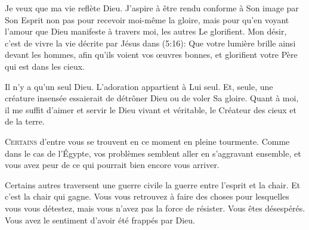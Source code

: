 
Je veux que ma vie reflète Dieu. J'aspire à être rendu conforme
 à Son image par Son Esprit \ocadr non pas pour recevoir moi-même la gloire,
 mais pour qu'en voyant l'amour que Dieu manifeste à travers moi,
 les autres Le glorifient.
 Mon désir, c'est de vivre la vie décrite par Jésus
 dans (5:16):
 \Og Que votre lumière brille ainsi devant les hommes,
 afin qu'ils voient vos \oe{}uvres bonnes,
 et glorifient votre Père qui est dans les cieux. \Fg{}

Il n'y a qu'un seul Dieu. L'adoration appartient à Lui seul.
 Et, seule, 
 une créature insensée essaierait de détrôner Dieu ou de voler Sa gloire.
 Quant à moi, il me suffit d'aimer et servir le Dieu vivant et véritable,
 le Créateur des cieux et de la terre. 

\dvrule






\lettrine{C}{ertains} d'entre vous se trouvent en ce moment
 en pleine tourmente.
 Comme dans le cas de l'Égypte, vos problèmes semblent aller
 en s'aggravant ensemble, et vous avez peur de ce qui pourrait
 bien encore vous arriver. 

Certains autres traversent une guerre civile
 \ocadr la guerre entre l'esprit et la chair.
 Et c'est la chair qui gagne. Vous vous retrouvez à faire des choses
 pour lesquelles vous vous détestez, mais vous n'avez pas la force
 de résister. Vous êtes désespérés. Vous avez le sentiment
 d'avoir été frappés par Dieu. 



